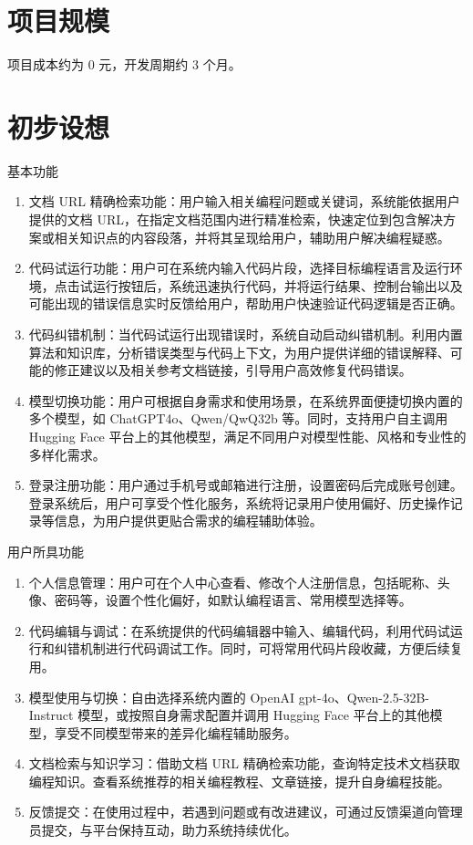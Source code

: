 \documentclass[
    report,     %
    oneside,    %
    UTF8,       %
    zihao=-4    %
]{config} %
\begin{document}
\section{项目规模}
项目成本约为 0 元，开发周期约 3 个月。

\section{初步设想}
基本功能
\begin{enumerate}[itemsep=2pt,topsep=0.6pt,parsep=0.6pt]
\item 文档 URL 精确检索功能：用户输入相关编程问题或关键词，系统能依据用户提供的文档 URL，在指定文档范围内进行精准检索，快速定位到包含解决方案或相关知识点的内容段落，并将其呈现给用户，辅助用户解决编程疑惑。
\item 代码试运行功能：用户可在系统内输入代码片段，选择目标编程语言及运行环境，点击试运行按钮后，系统迅速执行代码，并将运行结果、控制台输出以及可能出现的错误信息实时反馈给用户，帮助用户快速验证代码逻辑是否正确。
\item 代码纠错机制：当代码试运行出现错误时，系统自动启动纠错机制。利用内置算法和知识库，分析错误类型与代码上下文，为用户提供详细的错误解释、可能的修正建议以及相关参考文档链接，引导用户高效修复代码错误。
\item 模型切换功能：用户可根据自身需求和使用场景，在系统界面便捷切换内置的多个模型，如 ChatGPT4o、Qwen/QwQ32b 等。同时，支持用户自主调用 Hugging Face 平台上的其他模型，满足不同用户对模型性能、风格和专业性的多样化需求。
\item 登录注册功能：用户通过手机号或邮箱进行注册，设置密码后完成账号创建。登录系统后，用户可享受个性化服务，系统将记录用户使用偏好、历史操作记录等信息，为用户提供更贴合需求的编程辅助体验。
\end{enumerate}
用户所具功能
\begin{enumerate}[itemsep=2pt,topsep=0.6pt,parsep=0.6pt]
\item 个人信息管理：用户可在个人中心查看、修改个人注册信息，包括昵称、头像、密码等，设置个性化偏好，如默认编程语言、常用模型选择等。
\item 代码编辑与调试：在系统提供的代码编辑器中输入、编辑代码，利用代码试运行和纠错机制进行代码调试工作。同时，可将常用代码片段收藏，方便后续复用。
\item 模型使用与切换：自由选择系统内置的 OpenAI gpt-4o、Qwen-2.5-32B-Instruct 模型，或按照自身需求配置并调用 Hugging Face 平台上的其他模型，享受不同模型带来的差异化编程辅助服务。
\item 文档检索与知识学习：借助文档 URL 精确检索功能，查询特定技术文档获取编程知识。查看系统推荐的相关编程教程、文章链接，提升自身编程技能。
\item 反馈提交：在使用过程中，若遇到问题或有改进建议，可通过反馈渠道向管理员提交，与平台保持互动，助力系统持续优化。
\end{enumerate}
\end{document}
